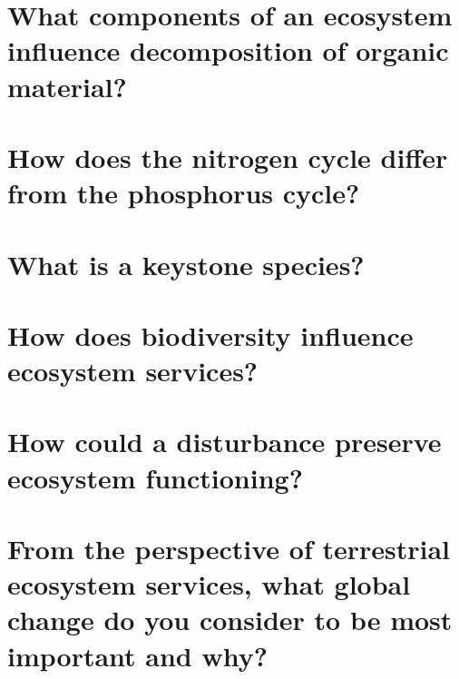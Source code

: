 \documentclass[12pt, notitlepage]{article}   	%
\def\wl{\par \vspace{\baselineskip}}
\begin{document}
{\wl
\wl
\wl
\wl
\wl
\wl
\wl
\wl

\section{\small{What components of an ecosystem influence decomposition of organic material?}}

\wl
\wl
\wl
\wl
\wl
\wl
\wl
\wl

\section{\small{How does the nitrogen cycle differ from the phosphorus cycle?}}

\newpage

\section{\small{What is a keystone species?}}

\wl
\wl
\wl
\wl
\wl

\section{\small{How does biodiversity influence ecosystem services?}}

\wl
\wl
\wl
\wl
\wl

\section{\small{How could a disturbance preserve ecosystem functioning?}}

\wl
\wl
\wl
\wl
\wl
\wl
\wl

\section{\small{From the perspective of terrestrial ecosystem services, what
global change do you consider to be most important and why?}}


} %
\end{document}
